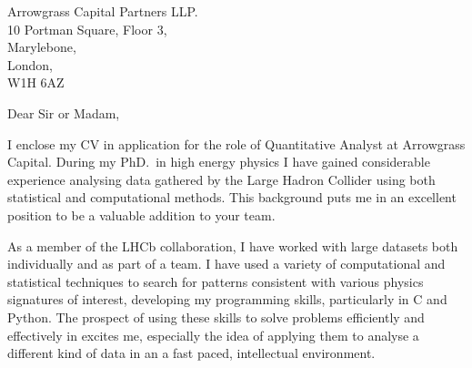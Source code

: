 
Arrowgrass Capital Partners LLP.\\
10 Portman Square, Floor 3,\\
Marylebone,\\
London,\\
W1H 6AZ\\


\vfill


Dear Sir or Madam,





I enclose my CV in application for the role of Quantitative Analyst at Arrowgrass Capital.
During my PhD.~in high energy physics I have gained considerable experience analysing data gathered
by the Large Hadron Collider using both statistical and computational methods.
This background puts me in an excellent position to be a valuable addition to your team.

As a member of the LHCb collaboration, I have worked with large datasets both individually and as
part of a team.
I have used a variety of computational and statistical techniques to search for patterns consistent
with various physics signatures of interest, developing my programming skills, particularly in
\mbox{\textsc{C\raisebox{0.1em}{{\footnotesize{++}}}}} and Python.
The prospect of using these skills to solve problems efficiently and effectively in excites me,
especially the idea of applying them to analyse a different kind of data in an a fast
paced, intellectual environment.

